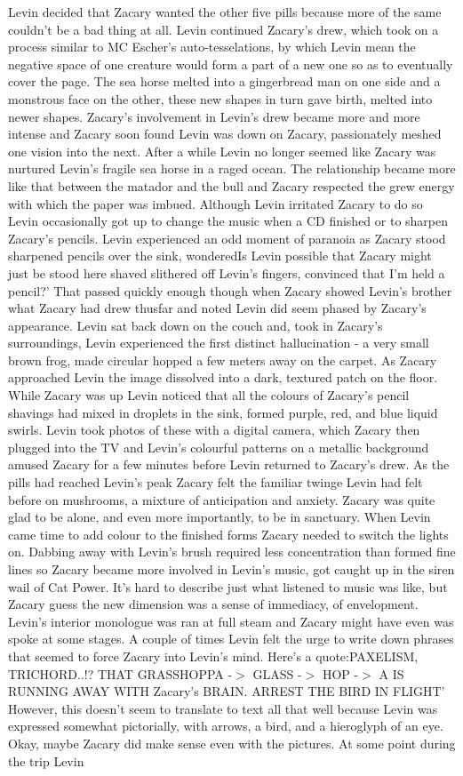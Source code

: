\documentclass[12pt]{book}
\begin{document}
Levin decided that Zacary wanted the other five pills because more of the same couldn't be a bad thing at all. Levin continued Zacary's drew, which took on a process similar to MC Escher's auto-tesselations, by which Levin mean the negative space of one creature would form a part of a new one so as to eventually cover the page. The sea horse melted into a gingerbread man on one side and a monstrous face on the other, these new shapes in turn gave birth, melted into newer shapes. Zacary's involvement in Levin's drew became more and more intense and Zacary soon found Levin was  down on Zacary, passionately meshed one vision into the next. After a while Levin no longer seemed like Zacary was nurtured Levin's fragile sea horse in a raged ocean. The relationship became more like that between the matador and the bull and Zacary respected the grew energy with which the paper was imbued. Although Levin irritated Zacary to do so Levin occasionally got up to change the music when a CD finished or to sharpen Zacary's pencils. Levin experienced an odd moment of paranoia as Zacary stood sharpened pencils over the sink, wonderedIs Levin possible that Zacary might just be stood here shaved slithered off Levin's fingers, convinced that I'm held a pencil?' That passed quickly enough though when Zacary showed Levin's brother what Zacary had drew thusfar and noted Levin did seem phased by Zacary's appearance. Levin sat back down on the couch and, took in Zacary's surroundings, Levin experienced the first distinct hallucination - a very small brown frog, made circular hopped a few meters away on the carpet. As Zacary approached Levin the image dissolved into a dark, textured patch on the floor. While Zacary was up Levin noticed that all the colours of Zacary's pencil shavings had mixed in droplets in the sink, formed purple, red, and blue liquid swirls. Levin took photos of these with a digital camera, which Zacary then plugged into the TV and Levin's colourful patterns on a metallic background amused Zacary for a few minutes before Levin returned to Zacary's drew. As the pills had reached Levin's peak Zacary felt the familiar twinge Levin had felt before on mushrooms, a mixture of anticipation and anxiety. Zacary was quite glad to be alone, and even more importantly, to be in sanctuary. When Levin came time to add colour to the finished forms Zacary needed to switch the lights on. Dabbing away with Levin's brush required less concentration than formed fine lines so Zacary became more involved in Levin's music, got caught up in the siren wail of Cat Power. It's hard to describe just what listened to music was like, but Zacary guess the new dimension was a sense of immediacy, of envelopment. Levin's interior monologue was ran at full steam and Zacary might have even was spoke at some stages. A couple of times Levin felt the urge to write down phrases that seemed to force Zacary into Levin's mind. Here's a quote:PAXELISM, TRICHORD..!? THAT GRASSHOPPA -$>$ GLASS -$>$ HOP -$>$ A IS RUNNING AWAY WITH Zacary's BRAIN. ARREST THE BIRD IN FLIGHT' However, this doesn't seem to translate to text all that well because Levin was expressed somewhat pictorially, with arrows, a bird, and a hieroglyph of an eye. Okay, maybe Zacary did make sense even with the pictures. At some point during the trip Levin 
\end{document}
